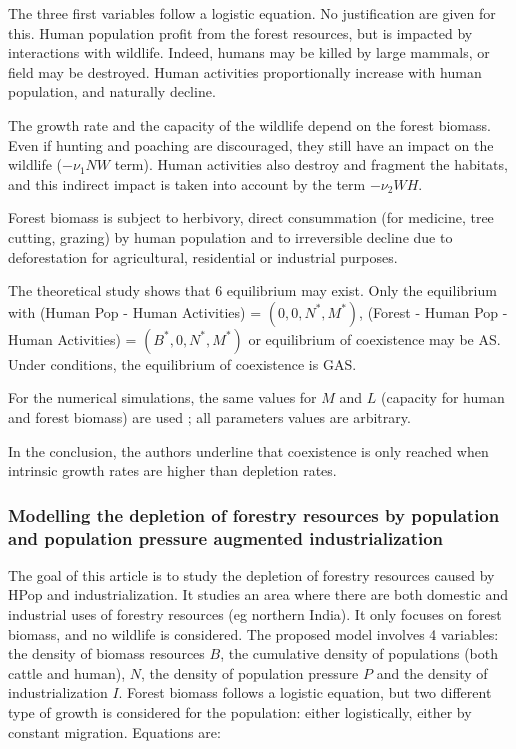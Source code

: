 \documentclass{article}
\begin{document}
The three first variables follow a logistic equation. No justification are given for this. Human population profit from the forest resources, but is impacted by interactions with wildlife. Indeed, humans may be killed by large mammals, or field may be destroyed. Human activities proportionally increase with human population, and naturally decline.  


The growth rate and the capacity of the wildlife depend on the forest biomass. Even if hunting and poaching are discouraged, they still have an impact on the wildlife ($-\nu_1 NW$ term). Human activities also destroy and fragment the habitats, and this indirect impact is taken into account by the term $-\nu_2 WH$.

Forest biomass is subject to herbivory, direct consummation (for medicine, tree cutting, grazing) by human population and to irreversible decline due to deforestation for agricultural, residential or industrial purposes.

The theoretical study shows that 6 equilibrium may exist. Only the equilibrium  with (Human Pop - Human Activities) = $(0,0,N^*, M^*)$, (Forest - Human Pop - Human Activities) = $(B^*,0,N^*, M^*)$ or equilibrium of coexistence may be AS. Under conditions, the equilibrium of coexistence is GAS.

For the numerical simulations, the same values for $M$ and $L$ (capacity for human and forest biomass) are used ; all parameters values are arbitrary. 

In the conclusion, the authors underline that coexistence is only reached when intrinsic growth rates are higher than depletion rates.

\subsubsection{Modelling the depletion of forestry resources by population and population pressure augmented industrialization \cite{dubey_modelling_2009}}


The goal of this article is to study the depletion of forestry resources caused by HPop and industrialization. It studies an area where there are both domestic and industrial uses of forestry resources (eg northern India). It only focuses on forest biomass, and no wildlife is considered. The proposed model involves 4 variables: the density of biomass resources $B$, the cumulative density of populations (both cattle and human), $N$, the density of population pressure $P$ and the density of industrialization $I$. Forest biomass follows a logistic equation, but two different type of growth is considered for the population: either logistically, either by constant migration. Equations are:
\end{document}
